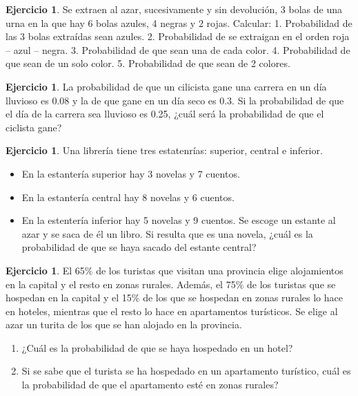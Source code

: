 \documentclass[]{article}
\providecommand{\tightlist}{%
  \setlength{\itemsep}{0pt}\setlength{\parskip}{0pt}}
\theoremstyle{plain}
\theoremstyle{definition}
\newtheorem{exercise}[theorem]{Ejercicio}
\theoremstyle{definition} %
\begin{document}
\begin{exercise}
Se extraen al azar, sucesivamente y sin devolución, 3 bolas de una urna
en la que hay 6 bolas azules, 4 negras y 2 rojas. Calcular: 1.
Probabilidad de las 3 bolas extraídas sean azules. 2. Probabilidad de se
extraigan en el orden roja -- azul -- negra. 3. Probabilidad de que sean
una de cada color. 4. Probabilidad de que sean de un solo color. 5.
Probabilidad de que sean de 2 colores.
\end{exercise}



\begin{exercise}
La probabilidad de que un cilicista gane una carrera en un día
  lluvioso es 0.08 y la de que gane en un día seco es 0.3. Si la
  probabilidad de que el día de la carrera sea lluvioso es 0.25, ¿cuál
  será la probabilidad de que el ciclista gane?
\end{exercise}

\begin{exercise}

  Una librería tiene tres estatenrías: superior, central e inferior.

  \begin{itemize}
  \tightlist
  \item
    En la estantería superior hay 3 novelas y 7 cuentos.
  \item
    En la estantería central hay 8 novelas y 6 cuentos.
  \item
    En la estentería inferior hay 5 novelas y 9 cuentos. Se escoge un
    estante al azar y se saca de él un libro. Si resulta que es una
    novela, ¿cuál es la probabilidad de que se haya sacado del estante
    central?
  \end{itemize}
\end{exercise}

  
  \begin{exercise}

  El 65\% de los turistas que visitan una provincia elige alojamientos
  en la capital y el resto en zonas rurales. Además, el 75\% de los
  turistas que se hospedan en la capital y el 15\% de los que se
  hospedan en zonas rurales lo hace en hoteles, mientras que el resto lo
  hace en apartamentos turísticos. Se elige al azar un turita de los que
  se han alojado en la provincia.

  \begin{enumerate}
  \def\labelenumii{\arabic{enumii}.}
  \tightlist
  \item
    ¿Cuál es la probabilidad de que se haya hospedado en un hotel?
  \item
    Si se sabe que el turista se ha hospedado en un apartamento
    turístico, cuál es la probabilidad de que el apartamento esté en
    zonas rurales?
  \end{enumerate}
\end{exercise}
\end{document}
